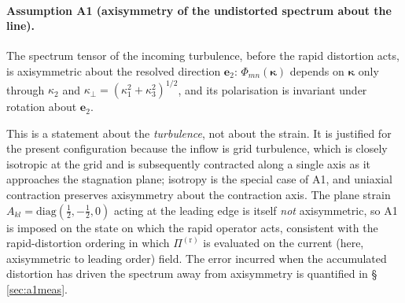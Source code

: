 \documentclass[lineno]{JFM-FLM_Au}
\begin{document}
\paragraph{Assumption A1 (axisymmetry of the undistorted spectrum about the
line).} The spectrum tensor of the incoming turbulence, before the rapid
distortion acts, is axisymmetric about the resolved direction $\boldsymbol{e}_2$:
$\Phi_{mn}(\boldsymbol{\kappa})$ depends on $\boldsymbol{\kappa}$ only through
$\kappa_2$ and $\kappa_\perp=(\kappa_1^2+\kappa_3^2)^{1/2}$, and its
polarisation is invariant under rotation about $\boldsymbol{e}_2$.

This is a statement about the \emph{turbulence}, not about the strain. It is
justified for the present configuration because the inflow is grid turbulence,
which is closely isotropic at the grid and is subsequently contracted along a
single axis as it approaches the stagnation plane; isotropy is the special
case of A1, and uniaxial contraction preserves axisymmetry about the
contraction axis. The plane strain $A_{kl}=\mathrm{diag}(\tfrac12,-\tfrac12,0)$
acting at the leading edge is itself \emph{not} axisymmetric, so A1 is imposed
on the state on which the rapid operator acts, consistent with the
rapid-distortion ordering in which $\Pi^{(\mathrm r)}$ is evaluated on the
current (here, axisymmetric to leading order) field. The error incurred when
the accumulated distortion has driven the spectrum away from axisymmetry is
quantified in \S\,\ref{sec:a1meas}.
\end{document}
